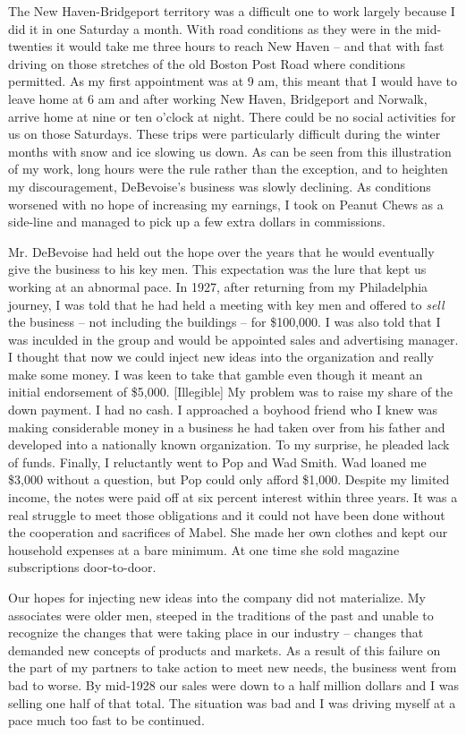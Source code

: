 \documentclass[12pt]{book}              %
\begin{document}
The New Haven-Bridgeport territory was a difficult one to work largely because I did it in one Saturday a month. With road conditions as they were in the mid-twenties it would take me three hours to reach New Haven -- and that with fast driving on those stretches of the old Boston Post Road where conditions permitted. As my first appointment was at 9 am, this meant that I would have to leave home at 6 am and after working New Haven, Bridgeport and Norwalk, arrive home at nine or ten o'clock at night. There could be no social activities for us on those Saturdays. These trips were particularly difficult during the winter months with snow and ice slowing us down. As can be seen from this illustration of my work, long hours were the rule rather than the exception, and to heighten my discouragement, DeBevoise's business was slowly declining. As conditions worsened with no hope of increasing my earnings, I took on Peanut Chews as a side-line and managed to pick up a few extra dollars in commissions.

Mr. DeBevoise had held out the hope over the years that he would eventually give the business to his key men. This expectation was the lure that kept us working at an abnormal pace. In 1927, after returning from my Philadelphia journey, I was told that he had held a meeting with key men and offered to \textit{sell} the business -- not including the buildings -- for \$100,000. I was also told that I was inculded in the group and would be appointed sales and advertising manager. I thought that now we could inject new ideas into the organization and really make some money. I was keen to take that gamble even though it meant an initial endorsement of \$5,000. [Illegible] My problem was to raise my share of the down payment. I had no cash. I approached a boyhood friend who I knew was making considerable money in a business he had taken over from his father and developed into a nationally known organization. To my surprise, he pleaded lack of funds. Finally, I reluctantly went to Pop and Wad Smith. Wad loaned me \$3,000 without a question, but Pop could only afford \$1,000. Despite my limited income, the notes were paid off at six percent interest within three years. It was a real struggle to meet those obligations and it could not have been done without the cooperation and sacrifices of Mabel. She made her own clothes and kept our household expenses at a bare minimum. At one time she sold magazine subscriptions door-to-door.

Our hopes for injecting new ideas into the company did not materialize. My associates were older men, steeped in the traditions of the past and unable to recognize the changes that were taking place in our industry -- changes that demanded new concepts of products and markets. As a result of this failure on the part of my partners to take action to meet new needs, the business went from bad to worse. By mid-1928 our sales were down to a half million dollars and I was selling one half of that total. The situation was bad and I was driving myself at a pace much too fast to be continued. 
\end{document}
